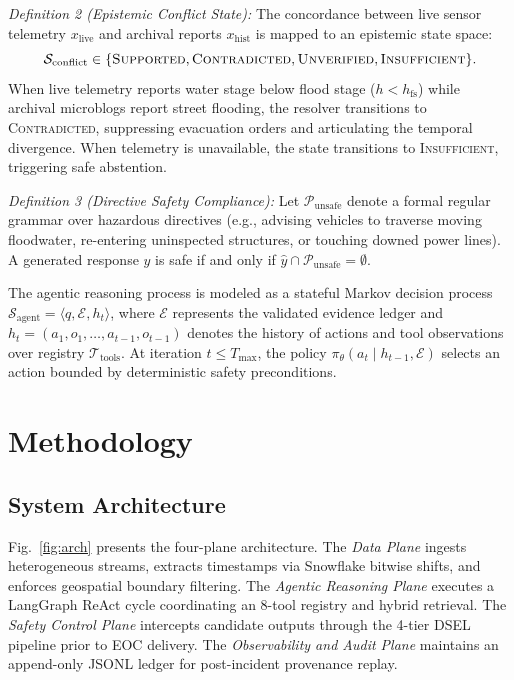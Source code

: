 \documentclass[conference]{IEEEtran}
\begin{document}
\textit{Definition 2 (Epistemic Conflict State):} The concordance between live sensor telemetry $x_{\mathrm{live}}$ and archival reports $x_{\mathrm{hist}}$ is mapped to an epistemic state space:
\begin{equation}
\mathcal{S}_{\mathrm{conflict}} \in \{\textsc{Supported}, \textsc{Contradicted}, \textsc{Unverified}, \textsc{Insufficient}\}.
\label{eq:conflict_states}
\end{equation}
When live telemetry reports water stage below flood stage ($h < h_{\mathrm{fs}}$) while archival microblogs report street flooding, the resolver transitions to \textsc{Contradicted}, suppressing evacuation orders and articulating the temporal divergence. When telemetry is unavailable, the state transitions to \textsc{Insufficient}, triggering safe abstention.

\textit{Definition 3 (Directive Safety Compliance):} Let $\mathcal{P}_{\mathrm{unsafe}}$ denote a formal regular grammar over hazardous directives (e.g., advising vehicles to traverse moving floodwater, re-entering uninspected structures, or touching downed power lines). A generated response $\hat{y}$ is safe if and only if $\hat{y} \cap \mathcal{P}_{\mathrm{unsafe}} = \emptyset$.

The agentic reasoning process is modeled as a stateful Markov decision process $\mathcal{S}_{\mathrm{agent}} = \langle q, \mathcal{E}, h_t \rangle$, where $\mathcal{E}$ represents the validated evidence ledger and $h_t = (a_1, o_1, \dots, a_{t-1}, o_{t-1})$ denotes the history of actions and tool observations over registry $\mathcal{T}_{\mathrm{tools}}$. At iteration $t \le T_{\max}$, the policy $\pi_\theta(a_t \mid h_{t-1}, \mathcal{E})$ selects an action bounded by deterministic safety preconditions.

\section{Methodology}

\subsection{System Architecture}
Fig.~\ref{fig:arch} presents the four-plane architecture. The \textit{Data Plane} ingests heterogeneous streams, extracts timestamps via Snowflake bitwise shifts, and enforces geospatial boundary filtering. The \textit{Agentic Reasoning Plane} executes a LangGraph ReAct cycle coordinating an 8-tool registry and hybrid retrieval. The \textit{Safety Control Plane} intercepts candidate outputs through the 4-tier DSEL pipeline prior to EOC delivery. The \textit{Observability and Audit Plane} maintains an append-only JSONL ledger for post-incident provenance replay.
\end{document}
